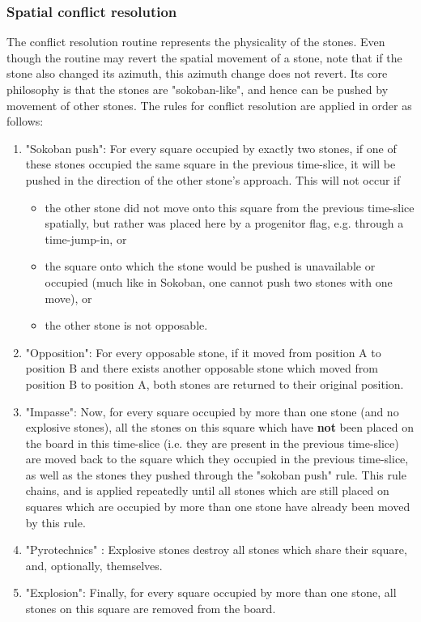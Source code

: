 \documentclass[12pt]{article}
\begin{document}
	\subsubsection{Spatial conflict resolution}\label{sec:spatial conflict resolution}
	The conflict resolution routine represents the physicality of the stones. Even though the routine may revert the spatial movement of a stone, note that if the stone also changed its azimuth, this azimuth change does not revert. Its core philosophy is that the stones are "sokoban-like", and hence can be pushed by movement of other stones. The rules for conflict resolution are applied in order as follows:
	\begin{enumerate}
		\item "Sokoban push": For every square occupied by exactly two stones, if one of these stones occupied the same square in the previous time-slice, it will be pushed in the direction of the other stone's approach. This will not occur if
		\begin{itemize}
			\item the other stone did not move onto this square from the previous time-slice spatially, but rather was placed here by a progenitor flag, e.g. through a time-jump-in, or
			\item the square onto which the stone would be pushed is unavailable or occupied (much like in Sokoban, one cannot push two stones with one move), or
			\item the other stone is not opposable.
		\end{itemize}
		\item "Opposition": For every opposable stone, if it moved from position A to position B and there exists another opposable stone which moved from position B to position A, both stones are returned to their original position.
		\item "Impasse": Now, for every square occupied by more than one stone (and no explosive stones), all the stones on this square which have \textbf{not} been placed on the board in this time-slice (i.e. they are present in the previous time-slice) are moved back to the square which they occupied in the previous time-slice, as well as the stones they pushed through the "sokoban push" rule. This rule chains, and is applied repeatedly until all stones which are still placed on squares which are occupied by more than one stone have already been moved by this rule.
		\item "Pyrotechnics" : Explosive stones destroy all stones which share their square, and, optionally, themselves.
		\item "Explosion": Finally, for every square occupied by more than one stone, all stones on this square are removed from the board.
	\end{enumerate}
\end{document}
